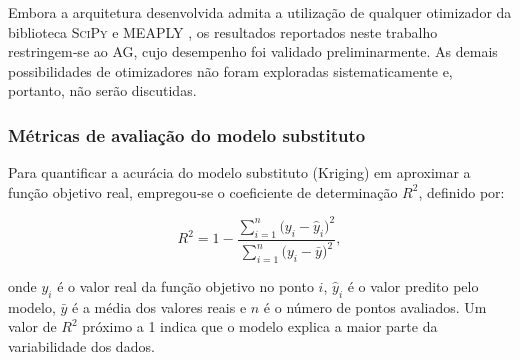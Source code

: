 Embora a arquitetura desenvolvida admita a utilização de qualquer otimizador da biblioteca \textsc{SciPy} \cite{virtanen2020scipy} e \textsc{MEAPLY} \cite{van2023mealpy}, os resultados reportados neste trabalho restringem‑se ao AG, cujo desempenho foi validado preliminarmente. As demais possibilidades de otimizadores não foram exploradas sistematicamente e, portanto, não serão discutidas.

\subsubsection{Métricas de avaliação do modelo substituto}

Para quantificar a acurácia do modelo substituto (Kriging) em aproximar a função objetivo real, empregou‑se o coeficiente de determinação $R^2$, definido por:

\begin{equation}
R^2 = 1 - \frac{\displaystyle\sum_{i=1}^{n} \bigl( y_i - \hat{y}_i \bigr)^2}
                {\displaystyle\sum_{i=1}^{n} \bigl( y_i - \bar{y} \bigr)^2},
\label{eq:r2}
\end{equation}

onde $y_i$ é o valor real da função objetivo no ponto $i$, $\hat{y}_i$ é o valor predito pelo modelo, $\bar{y}$ é a média dos valores reais e $n$ é o número de pontos avaliados. Um valor de $R^2$ próximo a 1 indica que o modelo explica a maior parte da variabilidade dos dados.




